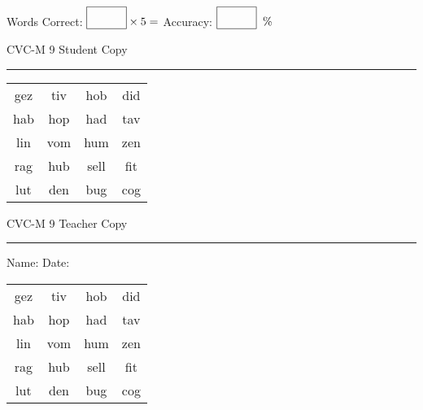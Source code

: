 \documentclass{memoir}
\begin{document}
\small

Words Correct: $\fbox{\phantom{\huge 100}} \times 5 = $ Accuracy: $\fbox{\phantom{\huge 100}}\;\; \%$ 

\vfill

\newpage


\footnotesize \noindent
CVC-M 9 \hfill Student Copy
\smallskip
\hrule

\Large

\setlength{\tabcolsep}{14pt}
\def\arraystretch{2}

{\selectfont


\begin{vplace}[0.5]
\begin{center}
\begin{tabular}{cccc}
gez & tiv & hob & did \\
hab & hop & had & tav \\
lin & vom & hum & zen \\
rag & hub & sell & fit \\
lut & den & bug & cog \\
\end{tabular}
\end{center}
\end{vplace}

}

\newpage

\footnotesize \noindent
CVC-M 9 \hfill Teacher Copy
\smallskip
\hrule

\small

\vfill

\noindent
Name: \underline{\hspace{1.75in}} \hfill Date: \underline{\hspace{1in}}

\Large

{\selectfont


\begin{vplace}[0.5]
\begin{center}
\begin{tabular}{cccc}
gez & tiv & hob & did \\
hab & hop & had & tav \\
lin & vom & hum & zen \\
rag & hub & sell & fit \\
lut & den & bug & cog \\
\end{tabular}
\end{center}
\end{vplace}



}
\end{document}

